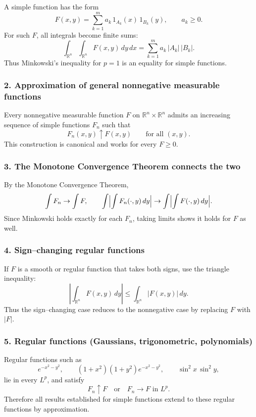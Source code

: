 \documentclass[12pt,a4paper]{article}
\theoremstyle{plain}
\theoremstyle{definition}
\theoremstyle{remark}
\theoremstyle{remark}
\begin{document}
A simple function has the form
\[
F(x,y) = \sum_{k=1}^m a_k\,1_{A_k}(x)\,1_{B_k}(y), \qquad a_k\ge 0.
\]
For such $F$, all integrals become finite sums:
\[
\int_{\mathbb{R}^n}\int_{\mathbb{R}^n} F(x,y)\,dy\,dx
= \sum_{k=1}^m a_k\,|A_k|\,|B_k|.
\]
Thus Minkowski's inequality for $p=1$ is an equality for simple functions.

\subsubsection*{2. Approximation of general nonnegative measurable functions}

Every nonnegative measurable function $F$ on $\mathbb{R}^n\times\mathbb{R}^n$
admits an increasing sequence of simple functions $F_n$ such that
\[
F_n(x,y) \uparrow F(x,y) \qquad\text{for all }(x,y).
\]
This construction is canonical and works for every $F\ge 0$.

\subsubsection*{3. The Monotone Convergence Theorem connects the two}

By the Monotone Convergence Theorem,
\[
\int F_n \to \int F,
\qquad
\int \Bigl|\int F_n(\cdot,y)\,dy\Bigr| \to 
\int \Bigl|\int F(\cdot,y)\,dy\Bigr|.
\]
Since Minkowski holds exactly for each $F_n$, taking limits shows it holds
for $F$ as well.

\subsubsection*{4. Sign--changing regular functions}

If $F$ is a smooth or regular function that takes both signs, use the
triangle inequality:
\[
\left|\int_{\mathbb{R}^n}F(x,y)\,dy\right|
\le \int_{\mathbb{R}^n}|F(x,y)|\,dy.
\]
Thus the sign--changing case reduces to the nonnegative case by replacing
$F$ with $|F|$.

\subsubsection*{5. Regular functions (Gaussians, trigonometric, polynomials)}

Regular functions such as
\[
e^{-x^2-y^2},\qquad (1+x^2)(1+y^2)e^{-x^2-y^2},\qquad
\sin^2 x\,\sin^2 y,
\]
lie in every $L^p$, and satisfy
\[
F_n \uparrow F \quad \text{or} \quad F_n\to F \text{ in } L^p.
\]
Therefore all results established for simple functions extend to these
regular functions by approximation.
\end{document}
